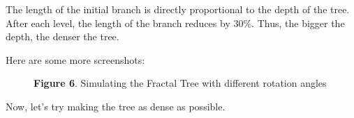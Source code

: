 \documentclass{resonance}
\begin{document}
The length of the initial branch is directly proportional to the depth of the tree. After each level, the length of the branch reduces by 30\%. Thus, the bigger the depth, the denser the tree.

Here are some more screenshots:

\pagebreak

\begin{figure}[ht]
\hskip 3.27cm

\vspace{10pt}
\hspace{70pt}\scriptsize{\textbf{Figure 6}. \normalfont Simulating the Fractal Tree with different rotation angles}
\end{figure}

\setlength{\leftskip}{-0cm}
Now, let's try making the tree as dense as possible.\\
\end{document}

